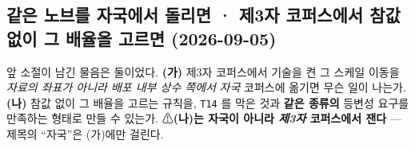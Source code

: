 \documentclass[11pt]{report}
\numberwithin{equation}{chapter}
\numberwithin{figure}{chapter}
\numberwithin{table}{chapter}
\begin{document}
\subsection{같은 노브를 자국에서 돌리면 · 제3자 코퍼스에서 참값 없이 그 배율을 고르면 (2026-09-05)}
\label{sec:results_t16}

앞 소절이 남긴 물음은 둘이었다. \textbf{(가)} 제3자 코퍼스에서 기술을 켠 그 스케일 이동을
\emph{자료의 좌표가 아니라 배포 내부 상수 쪽에서} \emph{자국} 코퍼스에 옮기면 무슨 일이
나는가. \textbf{(나)} 참값 없이 그 배율을 고르는 규칙을, \texttt{T14} 를 막은 것과
\textbf{같은 종류의} 등변성 요구를 만족하는 형태로 만들 수 있는가.
⚠\textbf{(나)는 자국이 아니라 \emph{제3자} 코퍼스에서 잰다} --- 제목의 ``자국''은
(가)에만 걸린다.
\end{document}
